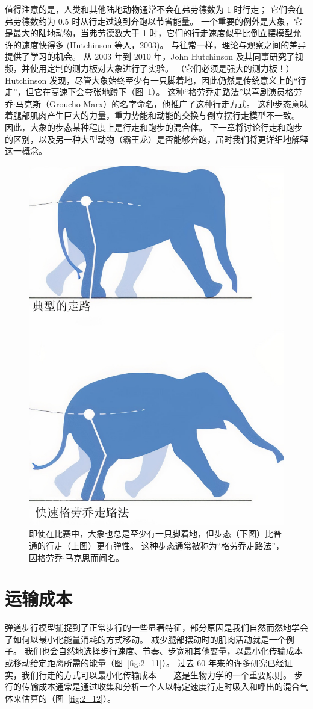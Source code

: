 值得注意的是，人类和其他陆地动物通常不会在弗劳德数为 1 时行走；
它们会在弗劳德数约为 0.5 时从行走过渡到奔跑以节省能量。
一个重要的例外是大象，它是最大的陆地动物，当弗劳德数大于 1 时，它们的行走速度似乎比倒立摆模型允许的速度快得多 (Hutchinson 等人，2003)。
与往常一样，理论与观察之间的差异提供了学习的机会。
从 2003 年到 2010 年，John Hutchinson 及其同事研究了视频，并使用定制的测力板对大象进行了实验。
（它们必须是强大的测力板！）
Hutchinson 发现，尽管大象始终至少有一只脚着地，因此仍然是传统意义上的“行走”，但它在高速下会夸张地蹲下（图~\ref{fig:2_10}）。
这种“格劳乔走路法”以喜剧演员格劳乔$\cdot$马克斯（Groucho Marx）的名字命名，他推广了这种行走方式。
这种步态意味着腿部肌肉产生巨大的力量，重力势能和动能的交换与倒立摆行走模型不一致。
因此，大象的步态某种程度上是行走和跑步的混合体。
下一章将讨论行走和跑步的区别，以及另一种大型动物（霸王龙）是否能够奔跑，届时我们将更详细地解释这一概念。

\begin{figure}[!htb]
	\centering
	\includegraphics[width=0.4\linewidth]{chap2/2_10}
	\caption{即使在比赛中，大象也总是至少有一只脚着地，但步态（下图）比普通的行走（上图）更有弹性。
		这种步态通常被称为“格劳乔走路法”，因格劳乔$\cdot$马克思而闻名。 \label{fig:2_10}}
\end{figure}


\section{运输成本}

弹道步行模型捕捉到了正常步行的一些显著特征，部分原因是我们自然而然地学会了如何以最小化能量消耗的方式移动。
减少腿部摆动时的肌肉活动就是一个例子。
我们也会自然地选择步行速度、节奏、步宽和其他变量，以最小化传输成本或移动给定距离所需的能量（图~\ref{fig:2_11}）。
过去 60 年来的许多研究已经证实，我们行走的方式可以最小化传输成本——这是生物力学的一个重要原则。
步行的传输成本通常是通过收集和分析一个人以特定速度行走时吸入和呼出的混合气体来估算的（图~\ref{fig:2_12}）。

